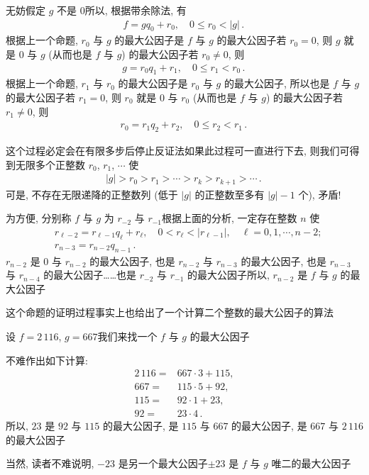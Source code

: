 \begin{pf}
    无妨假定 $g$ 不是 $0$\period 所以, 根据带余除法, 有
    \begin{align*}
        f = gq_0 + r_0, \quad 0 \leq r_0 < |g| \period
    \end{align*}
    根据上一个命题, $r_0$ 与 $g$ 的最大公因子是 $f$ 与 $g$ 的最大公因子\period 若 $r_0 = 0$, 则 $g$ 就是 $0$ 与 $g$ (从而也是 $f$ 与 $g$) 的最大公因子\period 若 $r_0 \neq 0$, 则
    \begin{align*}
        g = r_0 q_1 + r_1, \quad 0 \leq r_1 < r_0 \period
    \end{align*}
    根据上一个命题, $r_1$ 与 $r_0$ 的最大公因子是 $r_0$ 与 $g$ 的最大公因子, 所以也是 $f$ 与 $g$ 的最大公因子\period 若 $r_1 = 0$, 则 $r_0$ 就是 $0$ 与 $r_0$ (从而也是 $f$ 与 $g$) 的最大公因子\period 若 $r_1 \neq 0$, 则
    \begin{align*}
        r_0 = r_1 q_2 + r_2, \quad 0 \leq r_2 < r_1 \period
    \end{align*}

    这个过程必定会在有限多步后停止\period 反证法\period 如果此过程可一直进行下去, 则我们可得到无限多个正整数 $r_0$, $r_1$, $\cdots$ 使
    \begin{align*}
        |g| > r_0 > r_1 > \cdots > r_k > r_{k+1} > \cdots \period
    \end{align*}
    可是, 不存在无限递降的正整数列 (低于 $|g|$ 的正整数至多有 $|g| - 1$ 个), 矛盾!

    为方便, 分别称 $f$ 与 $g$ 为 $r_{-2}$ 与 $r_{-1}$\period 根据上面的分析, 一定存在整数 $n$ 使
    \begin{align*}
         & r_{\ell - 2} = r_{\ell - 1} q_{\ell} + r_{\ell}, \quad 0 < r_{\ell} < |r_{\ell - 1}|, \quad \ell = 0,1,\cdots,n-2; \\
         & r_{n - 3} = r_{n - 2} q_{n - 1} \period
    \end{align*}
    $r_{n-2}$ 是 $0$ 与 $r_{n-2}$ 的最大公因子, 也是 $r_{n-2}$ 与 $r_{n-3}$ 的最大公因子, 也是 $r_{n-3}$ 与 $r_{n-4}$ 的最大公因子……也是 $r_{-2}$ 与 $r_{-1}$ 的最大公因子\period 所以, $r_{n-2}$ 是 $f$ 与 $g$ 的最大公因子\period
\end{pf}

这个命题的证明过程事实上也给出了一个计算二个整数的最大公因子的算法\period

\begin{example}
    设 $f = 2\,116$, $g = 667$\period 我们来找一个 $f$ 与 $g$ 的最大公因子\period

    不难作出如下计算:
    \begin{align*}
        2\,116 = {} & 667 \cdot 3 + 115, \\
        667    = {} & 115 \cdot 5 + 92,  \\
        115    = {} & 92 \cdot 1 + 23,   \\
        92     = {} & 23 \cdot 4 \period
    \end{align*}
    所以, $23$ 是 $92$ 与 $115$ 的最大公因子, 是 $115$ 与 $667$ 的最大公因子, 是 $667$ 与 $2\,116$ 的最大公因子\period

    当然, 读者不难说明, $-23$ 是另一个最大公因子\period $\pm 23$ 是 $f$ 与 $g$ 唯二的最大公因子\period
\end{example}

